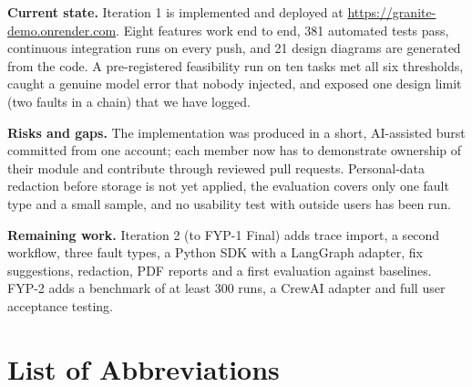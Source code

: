 \documentclass{fast-nuces-bs}
\begin{document}
\textbf{Current state.} Iteration 1 is implemented and deployed at \url{https://granite-demo.onrender.com}. Eight features work end to end, 381 automated tests pass, continuous integration runs on every push, and 21 design diagrams are generated from the code. A pre-registered feasibility run on ten tasks met all six thresholds, caught a genuine model error that nobody injected, and exposed one design limit (two faults in a chain) that we have logged.

\textbf{Risks and gaps.} The implementation was produced in a short, AI-assisted burst committed from one account; each member now has to demonstrate ownership of their module and contribute through reviewed pull requests. Personal-data redaction before storage is not yet applied, the evaluation covers only one fault type and a small sample, and no usability test with outside users has been run.

\textbf{Remaining work.} Iteration 2 (to FYP-1 Final) adds trace import, a second workflow, three fault types, a Python SDK with a LangGraph adapter, fix suggestions, redaction, PDF reports and a first evaluation against baselines. FYP-2 adds a benchmark of at least 300 runs, a CrewAI adapter and full user acceptance testing.

\tableofcontents
\listoffigures
\listoftables
\chapter*{List of Abbreviations}
\end{document}
